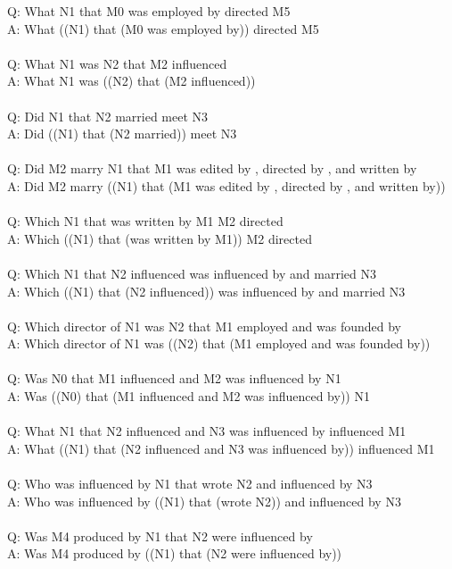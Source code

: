 \documentclass{article} \usepackage{iclr2022_conference,times}
\newcommand{\prompt}[1]{{\footnotesize \textsf{#1}}}
\begin{document}
\prompt{Q: What N1 that M0 was employed by directed M5 \\
A: What ((N1) that (M0 was employed by)) directed M5 \\
 \\
Q: What N1 was N2 that M2 influenced \\
A: What N1 was ((N2) that (M2 influenced)) \\
 \\
Q: Did N1 that N2 married meet N3 \\
A: Did ((N1) that (N2 married)) meet N3 \\
 \\
Q: Did M2 marry N1 that M1 was edited by , directed by , and written by \\
A: Did M2 marry ((N1) that (M1 was edited by , directed by , and written by)) \\
 \\
Q: Which N1 that was written by M1 M2 directed \\
A: Which ((N1) that (was written by M1)) M2 directed \\
 \\
Q: Which N1 that N2 influenced was influenced by and married N3 \\
A: Which ((N1) that (N2 influenced)) was influenced by and married N3 \\
 \\
Q: Which director of N1 was N2 that M1 employed and was founded by \\
A: Which director of N1 was ((N2) that (M1 employed and was founded by)) \\
 \\
Q: Was N0 that M1 influenced and M2 was influenced by N1 \\
A: Was ((N0) that (M1 influenced and M2 was influenced by)) N1 \\
 \\
Q: What N1 that N2 influenced and N3 was influenced by influenced M1 \\
A: What ((N1) that (N2 influenced and N3 was influenced by)) influenced M1 \\
 \\
Q: Who was influenced by N1 that wrote N2 and influenced by N3 \\
A: Who was influenced by ((N1) that (wrote N2)) and influenced by N3 \\
 \\
Q: Was M4 produced by N1 that N2 were influenced by \\
A: Was M4 produced by ((N1) that (N2 were influenced by)) \\
}
\end{document}
